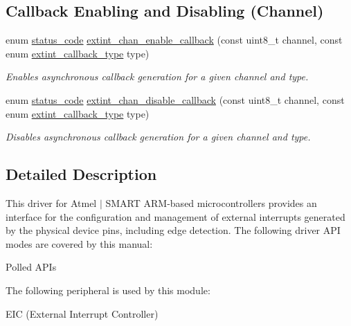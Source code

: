 \subsection*{Callback Enabling and Disabling (Channel)}
\begin{DoxyCompactItemize}
\item 
enum \mbox{\hyperlink{group__group__sam0__utils__status__codes_ga751c892e5a46b8e7d282085a5a5bf151}{status\+\_\+code}} \mbox{\hyperlink{group__asfdoc__sam0__extint__group_ga09e5568abbb3e5042b1048774a605ea4}{extint\+\_\+chan\+\_\+enable\+\_\+callback}} (const uint8\+\_\+t channel, const enum \mbox{\hyperlink{group__asfdoc__sam0__extint__group_gaf22af5117db5d011b371b05dfa8b50e3}{extint\+\_\+callback\+\_\+type}} type)
\begin{DoxyCompactList}\small\item\em Enables asynchronous callback generation for a given channel and type. \end{DoxyCompactList}\item 
enum \mbox{\hyperlink{group__group__sam0__utils__status__codes_ga751c892e5a46b8e7d282085a5a5bf151}{status\+\_\+code}} \mbox{\hyperlink{group__asfdoc__sam0__extint__group_ga939803cc928def37adf4f22bc727e8f7}{extint\+\_\+chan\+\_\+disable\+\_\+callback}} (const uint8\+\_\+t channel, const enum \mbox{\hyperlink{group__asfdoc__sam0__extint__group_gaf22af5117db5d011b371b05dfa8b50e3}{extint\+\_\+callback\+\_\+type}} type)
\begin{DoxyCompactList}\small\item\em Disables asynchronous callback generation for a given channel and type. \end{DoxyCompactList}\end{DoxyCompactItemize}


\subsection{Detailed Description}
This driver for Atmel\textregistered{} $\vert$ S\+M\+A\+RT A\+RM\textregistered{}-\/based microcontrollers provides an interface for the configuration and management of external interrupts generated by the physical device pins, including edge detection. The following driver A\+PI modes are covered by this manual\+:


\begin{DoxyItemize}
\item Polled A\+P\+Is
\end{DoxyItemize}

The following peripheral is used by this module\+:
\begin{DoxyItemize}
\item E\+IC (External Interrupt Controller)
\end{DoxyItemize}

